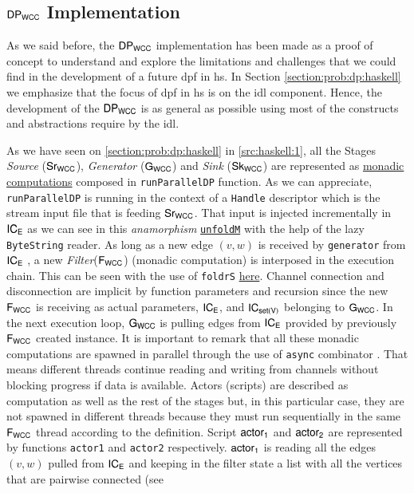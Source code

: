   \subsection{$\mathsf{DP_{WCC}}$  Implementation}
  As we said before, the  $\mathsf{DP_{WCC}}$ implementation has been made as a proof of concept to understand and explore the limitations and challenges that we could find in the development of a future  \acrshort{dpf} in \acrshort{hs}. In Section \ref{section:prob:dp:haskell} we emphasize that the focus of \acrshort{dpf} in \acrshort{hs} is on the \acrshort{idl} component. Hence, the development of the $\mathsf{DP_{WCC}}$ is as general as possible using most of the constructs and abstractions require by the  \acrshort{idl}.
  
  As we have seen on \autoref{section:prob:dp:haskell} in \autoref{src:haskell:1}, all the Stages \textit{Source} ($\mathsf{Sr_{WCC}}$),  \textit{Generator} ($\mathsf{G_{WCC}}$) and \textit{Sink} ($\mathsf{Sk_{WCC}}$) are represented as \href{https://github.com/jproyo/upc-miri-tfm/blob/17ee929f64a8be8a88ced782bfcf6bf355d8580a/connected-comp/src/ConnComp/Internal.hs#L20-L27}{monadic computations} composed in \texttt{runParallelDP} function. As we can appreciate, \texttt{runParallelDP} is running in the context of a \texttt{Handle} descriptor which is the stream input file that is feeding $\mathsf{Sr_{WCC}}$. That input is injected incrementally in $\mathsf{IC_E}$ as we can see in this \emph{anamorphism} \href{https://github.com/jproyo/upc-miri-tfm/blob/17ee929f64a8be8a88ced782bfcf6bf355d8580a/connected-comp/src/ConnComp/Internal.hs#L84-L85}{\texttt{unfoldM}} with the help of the lazy \texttt{ByteString} reader. As long as a new edge $(v,w)$ is received by \texttt{generator}  from $\mathsf{IC_E}$ , a new \textit{Filter}($\mathsf{F_{WCC}}$) (monadic computation) is interposed in the execution chain. This can be seen with the use of \texttt{foldrS}  \href{https://github.com/jproyo/upc-miri-tfm/blob/17ee929f64a8be8a88ced782bfcf6bf355d8580a/connected-comp/src/ConnComp/Internal.hs#L35-L41}{here}. Channel connection and disconnection are implicit by function parameters and recursion since the new $\mathsf{F_{WCC}}$ is receiving as actual parameters, $\mathsf{IC_E}$, and $\mathsf{IC_{set(V)}}$ belonging to $\mathsf{G_{WCC}}$. In the next execution loop, $\mathsf{G_{WCC}}$ is pulling edges from $\mathsf{IC_E}$ provided by previously $\mathsf{F_{WCC}}$ created instance. It is important to remark that all these monadic computations are spawned in parallel through the use of \texttt{async} combinator \cite{async}. That means different threads continue reading and writing from channels without blocking progress if data is available. Actors (scripts) are described as computation as well as the rest of the stages but, in this particular case, they are not spawned in different threads because they must run sequentially in the same $\mathsf{F_{WCC}}$ thread according to the definition. Script $\mathsf{actor_1}$ and $\mathsf{actor_2}$ are represented by functions \texttt{actor1} and \texttt{actor2} respectively. $\mathsf{actor_1}$ is reading all the edges $(v,w)$ pulled from $\mathsf{IC_E}$ and keeping in the filter state a list with all the vertices that are pairwise connected (see 